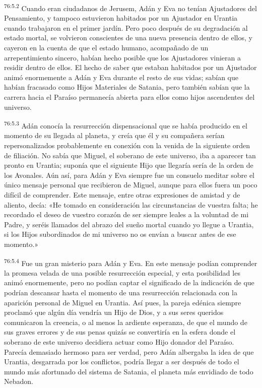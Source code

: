 \par
\textsuperscript{76:5.2} Cuando eran ciudadanos de Jerusem, Adán y Eva no tenían Ajustadores del Pensamiento, y tampoco estuvieron habitados por un Ajustador en Urantia cuando trabajaron en el primer jardín. Pero poco después de su degradación al estado mortal, se volvieron conscientes de una nueva presencia dentro de ellos, y cayeron en la cuenta de que el estado humano, acompañado de un arrepentimiento sincero, habían hecho posible que los Ajustadores vinieran a residir dentro de ellos. El hecho de saber que estaban habitados por un Ajustador animó enormemente a Adán y Eva durante el resto de sus vidas; sabían que habían fracasado como Hijos Materiales de Satania, pero también sabían que la carrera hacia el Paraíso permanecía abierta para ellos como hijos ascendentes del universo.

\par
\textsuperscript{76:5.3} Adán conocía la resurrección dispensacional que se había producido en el momento de su llegada al planeta, y creía que él y su compañera serían repersonalizados probablemente en conexión con la venida de la siguiente orden de filiación. No sabía que Miguel, el soberano de este universo, iba a aparecer tan pronto en Urantia; suponía que el siguiente Hijo que llegaría sería de la orden de los Avonales. Aún así, para Adán y Eva siempre fue un consuelo meditar sobre el único mensaje personal que recibieron de Miguel, aunque para ellos fuera un poco difícil de comprender. Este mensaje, entre otras expresiones de amistad y de aliento, decía: «He tomado en consideración las circunstancias de vuestra falta; he recordado el deseo de vuestro corazón de ser siempre leales a la voluntad de mi Padre, y seréis llamados del abrazo del sueño mortal cuando yo llegue a Urantia, si los Hijos subordinados de mi universo no os envían a buscar antes de ese momento.»

\par
\textsuperscript{76:5.4} Fue un gran misterio para Adán y Eva. En este mensaje podían comprender la promesa velada de una posible resurrección especial, y esta posibilidad les animó enormemente, pero no podían captar el significado de la indicación de que podrían descansar hasta el momento de una resurrección relacionada con la aparición personal de Miguel en Urantia. Así pues, la pareja edénica siempre proclamó que algún día vendría un Hijo de Dios, y a sus seres queridos comunicaron la creencia, o al menos la ardiente esperanza, de que el mundo de sus graves errores y de sus penas quizás se convertiría en la esfera donde el soberano de este universo decidiera actuar como Hijo donador del Paraíso. Parecía demasiado hermoso para ser verdad, pero Adán albergaba la idea de que Urantia, desgarrada por los conflictos, podría llegar a ser después de todo el mundo más afortunado del sistema de Satania, el planeta más envidiado de todo Nebadon.

